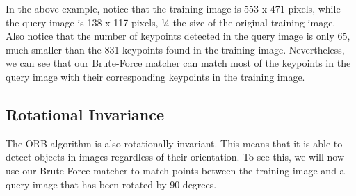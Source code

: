 \documentclass[11pt]{article}
\begin{document}
    In the above example, notice that the training image is 553 x 471
pixels, while the query image is 138 x 117 pixels, ¼ the size of the
original training image. Also notice that the number of keypoints
detected in the query image is only 65, much smaller than the 831
keypoints found in the training image. Nevertheless, we can see that our
Brute-Force matcher can match most of the keypoints in the query image
with their corresponding keypoints in the training image.

\hypertarget{rotational-invariance}{%
\subsection{Rotational Invariance}\label{rotational-invariance}}

The ORB algorithm is also rotationally invariant. This means that it is
able to detect objects in images regardless of their orientation. To see
this, we will now use our Brute-Force matcher to match points between
the training image and a query image that has been rotated by 90
degrees.
\end{document}
